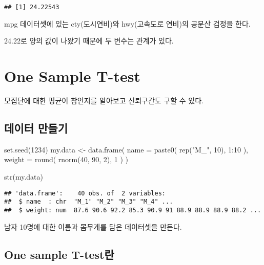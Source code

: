 \documentclass[
]{article}
\newenvironment{Shaded}{\begin{snugshade}}{\end{snugshade}}
\newcommand{\AttributeTok}[1]{\textcolor[rgb]{0.77,0.63,0.00}{#1}}
\newcommand{\DecValTok}[1]{\textcolor[rgb]{0.00,0.00,0.81}{#1}}
\newcommand{\FunctionTok}[1]{\textcolor[rgb]{0.00,0.00,0.00}{#1}}
\newcommand{\NormalTok}[1]{#1}
\newcommand{\OtherTok}[1]{\textcolor[rgb]{0.56,0.35,0.01}{#1}}
\newcommand{\SpecialCharTok}[1]{\textcolor[rgb]{0.00,0.00,0.00}{#1}}
\newcommand{\StringTok}[1]{\textcolor[rgb]{0.31,0.60,0.02}{#1}}
\begin{document}
\begin{verbatim}
## [1] 24.22543
\end{verbatim}

mpg 데이터셋에 있는 cty(도시연비)와 hwy(고속도로 연비)의 공분산 검정을 한다.

24.22로 양의 값이 나왔기 때문에 두 변수는 관계가 있다.

\hypertarget{one-sample-t-test}{%
\section{One Sample T-test}\label{one-sample-t-test}}

모집단에 대한 평균이 참인지를 알아보고 신뢰구간도 구할 수 있다.

\hypertarget{uxb370uxc774uxd130-uxb9ccuxb4e4uxae30}{%
\subsection{데이터 만들기}\label{uxb370uxc774uxd130-uxb9ccuxb4e4uxae30}}

\begin{Shaded}
\begin{Highlighting}[]
\FunctionTok{set.seed}\NormalTok{(}\DecValTok{1234}\NormalTok{)}
\NormalTok{my.data }\OtherTok{\textless{}{-}} \FunctionTok{data.frame}\NormalTok{( }\AttributeTok{name =} \FunctionTok{paste0}\NormalTok{( }\FunctionTok{rep}\NormalTok{(}\StringTok{"M\_"}\NormalTok{, }\DecValTok{10}\NormalTok{), }\DecValTok{1}\SpecialCharTok{:}\DecValTok{10}\NormalTok{ ), }\AttributeTok{weight =} \FunctionTok{round}\NormalTok{( }\FunctionTok{rnorm}\NormalTok{(}\DecValTok{40}\NormalTok{, }\DecValTok{90}\NormalTok{, }\DecValTok{2}\NormalTok{), }\DecValTok{1}\NormalTok{ ) )}

\FunctionTok{str}\NormalTok{(my.data)}
\end{Highlighting}
\end{Shaded}

\begin{verbatim}
## 'data.frame':    40 obs. of  2 variables:
##  $ name  : chr  "M_1" "M_2" "M_3" "M_4" ...
##  $ weight: num  87.6 90.6 92.2 85.3 90.9 91 88.9 88.9 88.9 88.2 ...
\end{verbatim}

남자 10명에 대한 이름과 몸무게를 담은 데이터셋을 만든다.

\hypertarget{one-sample-t-testuxb780}{%
\subsection{One sample T-test란}\label{one-sample-t-testuxb780}}
\end{document}
